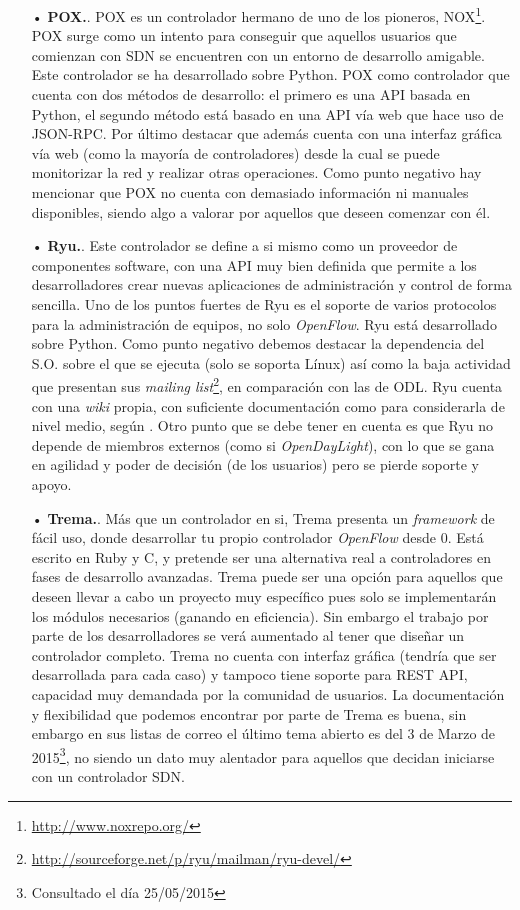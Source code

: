\documentclass[a4paper,11pt]{book}
\begin{document}
\begin{itemize}
\item[•]\textbf{POX.}\cite{pox}. POX es un controlador hermano de uno de los pioneros, NOX\footnote{\url{http://www.noxrepo.org/}}. POX surge como un intento para conseguir que aquellos usuarios que comienzan con \ac{SDN} se encuentren con un entorno de desarrollo amigable. Este controlador se ha desarrollado sobre Python. POX como controlador que cuenta con dos métodos de desarrollo: el primero es una \ac{API} basada en Python, el segundo método está basado en una \ac{API} vía web que hace uso de JSON-RPC. Por último destacar que además cuenta con una interfaz gráfica vía web (como la mayoría de controladores) desde la cual se puede monitorizar la red y realizar otras operaciones. Como punto negativo hay mencionar que POX no cuenta con demasiado información ni manuales disponibles, siendo algo a valorar por aquellos que deseen comenzar con él.

\item[•]\textbf{Ryu.}\cite{ryu}. Este controlador se define a si mismo como un proveedor de componentes software, con una \ac{API} muy bien definida que permite a los desarrolladores crear nuevas aplicaciones de administración y control de forma sencilla. Uno de los puntos fuertes de Ryu es el soporte de varios protocolos para la administración de equipos, no solo \emph{OpenFlow}. Ryu está desarrollado sobre Python. Como punto negativo debemos destacar la dependencia del S.O. sobre el que se ejecuta (solo se soporta Línux) así como la baja actividad que presentan sus \textit{mailing list}\footnote{\url{http://sourceforge.net/p/ryu/mailman/ryu-devel/}}, en comparación con las de \ac{ODL}. Ryu cuenta con una \textit{wiki} propia, con suficiente documentación como para considerarla de nivel medio, según \cite{comparativaSDN1}. Otro punto que se debe tener en cuenta es que Ryu no depende de miembros externos (como si \emph{OpenDayLight}), con lo que se gana en agilidad y poder de decisión (de los usuarios) pero se pierde soporte y apoyo.

\item[•]\textbf{Trema.}\cite{trema}. Más que un controlador en si, Trema presenta un \textit{framework} de fácil uso, donde desarrollar tu propio controlador \emph{OpenFlow} desde 0. Está escrito en Ruby y C, y pretende ser una alternativa real a controladores en fases de desarrollo avanzadas. Trema puede ser una opción para aquellos que deseen llevar a cabo un proyecto muy específico pues solo se implementarán los módulos necesarios (ganando en eficiencia). Sin embargo el trabajo por parte de los desarrolladores se verá aumentado al tener que diseñar un controlador completo. Trema no cuenta con interfaz gráfica (tendría que ser desarrollada para cada caso) y tampoco tiene soporte para \ac{REST} \ac{API}, capacidad muy demandada por la comunidad de usuarios. La documentación y flexibilidad que podemos encontrar por parte de Trema es buena, sin embargo en sus listas de correo el último tema abierto es del 3 de Marzo de 2015\footnote{Consultado el día 25/05/2015}, no siendo un dato muy alentador para aquellos que decidan iniciarse con un controlador \ac{SDN}.


\end{itemize}
\end{document}
